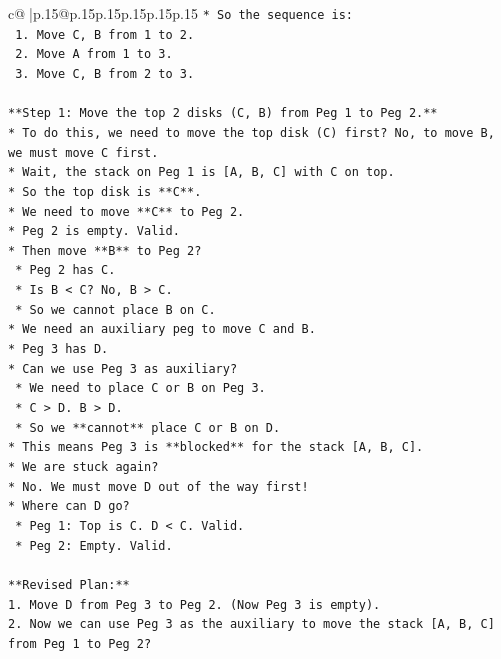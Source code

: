 \documentclass{article}
\begin{document}
{\begin{supertabular}{c@{$\;$}|p{.15\linewidth}@{}p{.15\linewidth}p{.15\linewidth}p{.15\linewidth}p{.15\linewidth}p{.15\linewidth}}
{{{\texttt{*   So the sequence is:} \\
\texttt{    1. Move C, B from 1 to 2.} \\
\texttt{    2. Move A from 1 to 3.} \\
\texttt{    3. Move C, B from 2 to 3.} \\
\\ 
\texttt{**Step 1: Move the top 2 disks (C, B) from Peg 1 to Peg 2.**} \\
\texttt{*   To do this, we need to move the top disk (C) first? No, to move B, we must move C first.} \\
\texttt{*   Wait, the stack on Peg 1 is {[}A, B, C{]} with C on top.} \\
\texttt{*   So the top disk is **C**.} \\
\texttt{*   We need to move **C** to Peg 2.} \\
\texttt{*   Peg 2 is empty. Valid.} \\
\texttt{*   Then move **B** to Peg 2?} \\
\texttt{    *   Peg 2 has C.} \\
\texttt{    *   Is B < C? No, B > C.} \\
\texttt{    *   So we cannot place B on C.} \\
\texttt{*   We need an auxiliary peg to move C and B.} \\
\texttt{*   Peg 3 has D.} \\
\texttt{*   Can we use Peg 3 as auxiliary?} \\
\texttt{    *   We need to place C or B on Peg 3.} \\
\texttt{    *   C > D. B > D.} \\
\texttt{    *   So we **cannot** place C or B on D.} \\
\texttt{*   This means Peg 3 is **blocked** for the stack {[}A, B, C{]}.} \\
\texttt{*   We are stuck again?} \\
\texttt{*   No. We must move D out of the way first!} \\
\texttt{*   Where can D go?} \\
\texttt{    *   Peg 1: Top is C. D < C. Valid.} \\
\texttt{    *   Peg 2: Empty. Valid.} \\
\\ 
\texttt{**Revised Plan:**} \\
\texttt{1.  Move D from Peg 3 to Peg 2. (Now Peg 3 is empty).} \\
\texttt{2.  Now we can use Peg 3 as the auxiliary to move the stack {[}A, B, C{]} from Peg 1 to Peg 2?} \\
}}}
\end{supertabular}}
\end{document}
